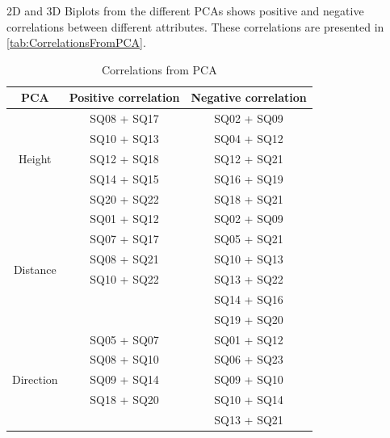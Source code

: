 %
2D and 3D Biplots from the different PCAs shows positive and negative correlations between different attributes. These correlations are presented in \autoref{tab:CorrelationsFromPCA}.
%
\begin{table}[H]
	\centering
	\caption{Correlations from PCA}
	\label{tab:CorrelationsFromPCA} 
	\begin{tabular}{ c|c|c }
		\centering
		PCA & Positive correlation & Negative correlation \\ \hline
		\multirow{5}{*}{Height} & SQ08  + SQ17 & SQ02  + SQ09 \\
		& SQ10 + SQ13 & SQ04 + SQ12 \\
		& SQ12 + SQ18 & SQ12 + SQ21 \\
		& SQ14 + SQ15 & SQ16 + SQ19 \\
		& SQ20 + SQ22 & SQ18 + SQ21\\ \hline
		\multirow{6}{*}{Distance} & SQ01 + SQ12 & SQ02 + SQ09 \\
		& SQ07 + SQ17 & SQ05 + SQ21 \\
		& SQ08 + SQ21 & SQ10 + SQ13 \\
		& SQ10 + SQ22 & SQ13 + SQ22 \\
		&  & SQ14 + SQ16 \\	
		&  & SQ19 + SQ20 \\ \hline	
		\multirow{5}{*}{Direction} 
		& SQ05 + SQ07 & SQ01 + SQ12 \\
		& SQ08 + SQ10 & SQ06 + SQ23 \\
		& SQ09 + SQ14 & SQ09 + SQ10 \\
		& SQ18 + SQ20 & SQ10 + SQ14 \\
		&  & SQ13 + SQ21
	\end{tabular}        
\end{table}
